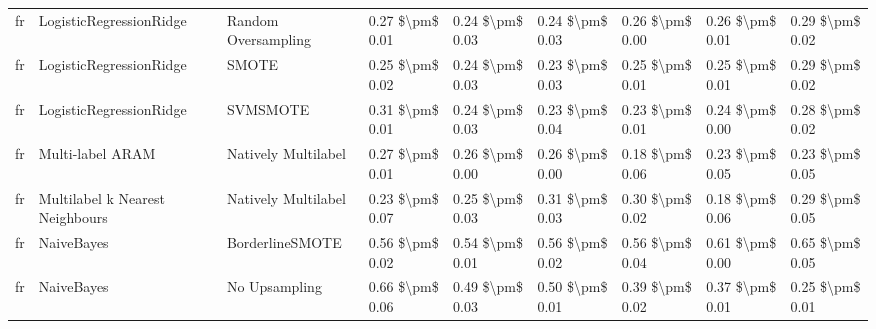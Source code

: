 \begin{tabular}{lllllllll}
      fr &         LogisticRegressionRidge &           Random Oversampling &     0.27 \$\textbackslash pm\$ 0.01 &           0.24 \$\textbackslash pm\$ 0.03 &       0.24 \$\textbackslash pm\$ 0.03 &        0.26 \$\textbackslash pm\$ 0.00 &                         0.26 \$\textbackslash pm\$ 0.01 &     0.29 \$\textbackslash pm\$ 0.02 \\
      fr &         LogisticRegressionRidge &                         SMOTE &     0.25 \$\textbackslash pm\$ 0.02 &           0.24 \$\textbackslash pm\$ 0.03 &       0.23 \$\textbackslash pm\$ 0.03 &        0.25 \$\textbackslash pm\$ 0.01 &                         0.25 \$\textbackslash pm\$ 0.01 &     0.29 \$\textbackslash pm\$ 0.02 \\
      fr &         LogisticRegressionRidge &                      SVMSMOTE &     0.31 \$\textbackslash pm\$ 0.01 &           0.24 \$\textbackslash pm\$ 0.03 &       0.23 \$\textbackslash pm\$ 0.04 &        0.23 \$\textbackslash pm\$ 0.01 &                         0.24 \$\textbackslash pm\$ 0.00 &     0.28 \$\textbackslash pm\$ 0.02 \\
      fr &                Multi-label ARAM &           Natively Multilabel &     0.27 \$\textbackslash pm\$ 0.01 &           0.26 \$\textbackslash pm\$ 0.00 &       0.26 \$\textbackslash pm\$ 0.00 &        0.18 \$\textbackslash pm\$ 0.06 &                         0.23 \$\textbackslash pm\$ 0.05 &     0.23 \$\textbackslash pm\$ 0.05 \\
      fr & Multilabel k Nearest Neighbours &           Natively Multilabel &     0.23 \$\textbackslash pm\$ 0.07 &           0.25 \$\textbackslash pm\$ 0.03 &       0.31 \$\textbackslash pm\$ 0.03 &        0.30 \$\textbackslash pm\$ 0.02 &                         0.18 \$\textbackslash pm\$ 0.06 &     0.29 \$\textbackslash pm\$ 0.05 \\
      fr &                      NaiveBayes &               BorderlineSMOTE &     0.56 \$\textbackslash pm\$ 0.02 &           0.54 \$\textbackslash pm\$ 0.01 &       0.56 \$\textbackslash pm\$ 0.02 &        0.56 \$\textbackslash pm\$ 0.04 &                         0.61 \$\textbackslash pm\$ 0.00 &     0.65 \$\textbackslash pm\$ 0.05 \\
      fr &                      NaiveBayes &                 No Upsampling &     0.66 \$\textbackslash pm\$ 0.06 &           0.49 \$\textbackslash pm\$ 0.03 &       0.50 \$\textbackslash pm\$ 0.01 &        0.39 \$\textbackslash pm\$ 0.02 &                         0.37 \$\textbackslash pm\$ 0.01 &     0.25 \$\textbackslash pm\$ 0.01 \\

\end{tabular}
